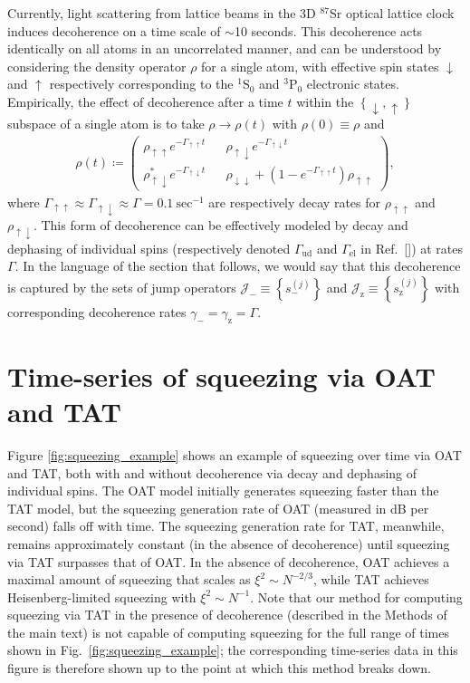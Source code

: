 \documentclass{nature}
\renewcommand{\t}{\text} %
\newcommand{\p}[1]{\left(#1\right)} %
\renewcommand{\set}[1]{\left\{#1\right\}} %
\newcommand{\J}{\mathcal{J}}
\newcommand{\z}{\text{z}}
\newcommand{\up}{\uparrow}
\newcommand{\dn}{\downarrow}
\begin{document}
Currently, light scattering from lattice beams in the 3D $^{87}$Sr optical lattice clock induces decoherence on a time scale of $\sim$10 seconds\cite{goban2018emergence, hutson2019engineering}.
This decoherence acts identically on all atoms in an uncorrelated manner, and can be understood by considering the density operator $\rho$ for a single atom, with effective spin states $\dn$ and $\up$ respectively corresponding to the ${}^1\t{S}_0$ and ${}^3\t{P}_0$ electronic states.
Empirically, the effect of decoherence after a time $t$ within the $\set{\dn,\up}$ subspace of a single atom is to take $\rho\to\rho\p{t}$ with $\rho\p{0}\equiv\rho$ and
\begin{align}
  \rho\p{t} \coloneqq
  \begin{pmatrix}
  \rho_{\up\up} e^{-\Gamma_{\up\up}t} &&
  \rho_{\up\dn} e^{-\Gamma_{\up\dn}t} \\
  \rho_{\up\dn}^* e^{-\Gamma_{\up\dn}t} &&
  \rho_{\dn\dn} + \p{1-e^{-\Gamma_{\up\up}t}} \rho_{\up\up}
  \end{pmatrix},
  \label{eq:decay_matrix}
\end{align}
where $\Gamma_{\up\up}\approx\Gamma_{\up\dn}\approx\Gamma=0.1~\t{sec}^{-1}$ are respectively decay rates for $\rho_{\up\up}$ and $\rho_{\up\dn}$.
This form of decoherence can be effectively modeled by decay and dephasing of individual spins (respectively denoted $\Gamma_{\t{ud}}$ and $\Gamma_{\t{el}}$ in Ref.~[]) at rates $\Gamma$.
In the language of the section that follows, we would say that this decoherence is captured by the sets of jump operators $\J_-\equiv\set{s_-^{(j)}}$ and $\J_\z\equiv\set{s_\z^{(j)}}$ with corresponding decoherence rates $\gamma_-=\gamma_\z=\Gamma$.

\section*{Time-series of squeezing via OAT and TAT}

Figure \ref{fig:squeezing_example} shows an example of squeezing over time via OAT and TAT, both with and without decoherence via decay and dephasing of individual spins.
The OAT model initially generates squeezing faster than the TAT model, but the squeezing generation rate of OAT (measured in dB per second) falls off with time.
The squeezing generation rate for TAT, meanwhile, remains approximately constant (in the absence of decoherence) until squeezing via TAT surpasses that of OAT.
In the absence of decoherence, OAT achieves a maximal amount of squeezing that scales as $\xi^2\sim N^{-2/3}$, while TAT achieves Heisenberg-limited squeezing with $\xi^2\sim N^{-1}$.
Note that our method for computing squeezing via TAT in the presence of decoherence (described in the Methods of the main text) is not capable of computing squeezing for the full range of times shown in Fig.~\ref{fig:squeezing_example}; the corresponding time-series data in this figure is therefore shown up to the point at which this method breaks down.
\end{document}

